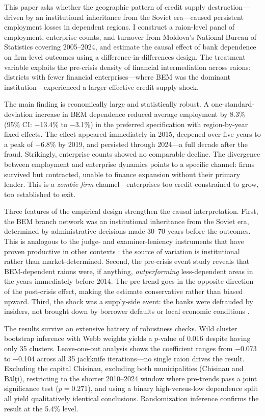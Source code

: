 \documentclass[12pt]{article}
\begin{document}
This paper asks whether the geographic pattern of credit supply destruction---driven by an institutional inheritance from the Soviet era---caused persistent employment losses in dependent regions. I construct a raion-level panel of employment, enterprise counts, and turnover from Moldova's National Bureau of Statistics covering 2005--2024, and estimate the causal effect of bank dependence on firm-level outcomes using a difference-in-differences design. The treatment variable exploits the pre-crisis density of financial intermediation across raions: districts with fewer financial enterprises---where BEM was the dominant institution---experienced a larger effective credit supply shock.

The main finding is economically large and statistically robust. A one-standard-deviation increase in BEM dependence reduced average employment by 8.3\% (95\% CI: $-$13.4\% to $-$3.1\%) in the preferred specification with region-by-year fixed effects. The effect appeared immediately in 2015, deepened over five years to a peak of $-$6.8\% by 2019, and persisted through 2024---a full decade after the fraud. Strikingly, enterprise counts showed no comparable decline. The divergence between employment and enterprise dynamics points to a specific channel: firms survived but contracted, unable to finance expansion without their primary lender. This is a \emph{zombie firm} channel---enterprises too credit-constrained to grow, too established to exit.

Three features of the empirical design strengthen the causal interpretation. First, the BEM branch network was an institutional inheritance from the Soviet era, determined by administrative decisions made 30--70 years before the outcomes. This is analogous to the judge- and examiner-leniency instruments that have proven productive in other contexts \citep{kling2006incarceration, sampat2019examiner}: the source of variation is institutional rather than market-determined. Second, the pre-crisis event study reveals that BEM-dependent raions were, if anything, \emph{outperforming} less-dependent areas in the years immediately before 2014. The pre-trend goes in the opposite direction of the post-crisis effect, making the estimate conservative rather than biased upward. Third, the shock was a supply-side event: the banks were defrauded by insiders, not brought down by borrower defaults or local economic conditions \citep{world_bank2015moldova}.

The results survive an extensive battery of robustness checks. Wild cluster bootstrap inference with Webb weights yields a $p$-value of 0.016 despite having only 35 clusters. Leave-one-out analysis shows the coefficient ranges from $-$0.073 to $-$0.104 across all 35 jackknife iterations---no single raion drives the result. Excluding the capital Chisinau, excluding both municipalities (Chisinau and B\u{a}l\c{t}i), restricting to the shorter 2010--2024 window where pre-trends pass a joint significance test ($p = 0.271$), and using a binary high-versus-low dependence split all yield qualitatively identical conclusions. Randomization inference confirms the result at the 5.4\% level.
\end{document}
